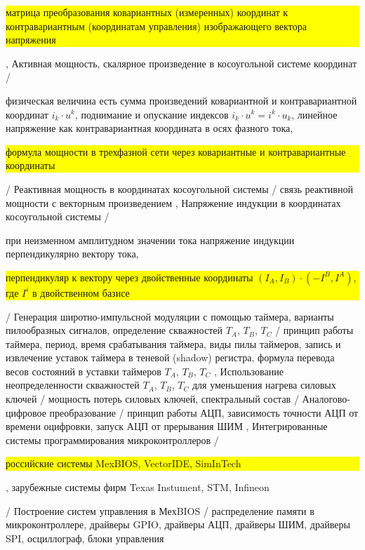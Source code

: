 {{   \colorbox{yellow}{\parbox{0.82\textwidth}{матрица преобразования ковариантных (измеренных) координат к контравариантным (координатам управления) изображающего вектора напряжения}}
},
{Активная мощность, скалярное произведение в косоугольной системе координат}
/{
   физическая величина есть сумма произведений ковариантной и контравариантной координат $i_k\cdot u^k$,
   поднимание и опускание индексов $i_k\cdot u^k = i^k\cdot u_k$,
   линейное напряжение как контравариантная координата в осях фазного тока,
   \colorbox{yellow}{\parbox{0.82\textwidth}{формула мощности в трехфазной сети через ковариантные и контравариантные координаты}}
}/
Реактивная мощность в координатах косоугольной системы
/{ связь реактивной мощности с векторным произведением
},
Напряжение индукции в координатах косоугольной системы
/{
  при неизменном амплитудном значении тока напряжение индукции перпендикулярно вектору тока,
  \colorbox{yellow}{\parbox{0.82\textwidth}{перпендикуляр к вектору через двойственные координаты $(I_A, I_B)\cdot (-I^B, I^A)$, где $I^i$ в двойственном базисе}}
}/
{Генерация широтно-импульсной модуляции с помощью таймера, варианты пилообразных сигналов, определение скважностей $T_A$, $T_B$, $T_C$}
/{
   {принцип работы таймера, период, время срабатывания таймера},
   виды пилы таймеров,
   запись и извлечение уставок таймера в теневой (shadow) регистра,
   {формула перевода весов состояний в уставки таймеров $T_A$, $T_B$, $T_C$}
},
{Использование неопределенности скважностей $T_A$, $T_B$, $T_C$ для уменьшения нагрева силовых ключей}
/{
   мощность потерь силовых ключей,
   спектральный состав
}/
Аналогово-цифровое преобразование
/{
   принцип работы АЦП,
   зависимость точности АЦП от времени оцифровки,
   запуск АЦП от прерывания ШИМ
},
Интегрированные системы программирования микроконтроллеров
/{
    \colorbox{yellow}{\parbox{0.82\textwidth}{российские системы MexBIOS, VectorIDE, SimInTech}},
    {зарубежные системы фирм Texas Instument, STM, Infineon}
}/
Построение систем управления в МехBIOS
/{
   распределение памяти в микроконтроллере,
   драйверы GPIO,
   драйверы АЦП,
   драйверы ШИМ,
   драйверы SPI,
   осциллограф,
   блоки управления
}} {
}

